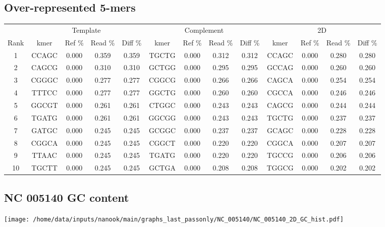 \documentclass[a4paper,11pt,oneside]{article}
\begin{document}
\subsection*{Over-represented 5-mers}
\vspace{-3mm}
\begin{table}[H]
{\footnotesize
\fontsize{7pt}{9pt}\selectfont
\begin{tabular}{|c|c c c c|c c c c|c c c c|}
\cline{1-13}
 & \multicolumn{4}{c|}{Template} & \multicolumn{4}{c|}{Complement} & \multicolumn{4}{c|}{2D} \\
Rank & kmer & Ref \% & Read \% & Diff \% & kmer & Ref \% & Read \% & Diff \% & kmer & Ref \% & Read \% & Diff \% \\
\cline{1-13}
1 & CCAGC & 0.000 & 0.359 & 0.359 & TGCTG & 0.000 & 0.312 & 0.312 & CCAGC & 0.000 & 0.280 & 0.280 \\
2 & CAGCG & 0.000 & 0.310 & 0.310 & GCTGG & 0.000 & 0.295 & 0.295 & GCCAG & 0.000 & 0.260 & 0.260 \\
3 & CGGGC & 0.000 & 0.277 & 0.277 & CGGCG & 0.000 & 0.266 & 0.266 & CAGCA & 0.000 & 0.254 & 0.254 \\
4 & TTTCC & 0.000 & 0.277 & 0.277 & GGCTG & 0.000 & 0.260 & 0.260 & CGCCA & 0.000 & 0.246 & 0.246 \\
5 & GGCGT & 0.000 & 0.261 & 0.261 & CTGGC & 0.000 & 0.243 & 0.243 & CAGCG & 0.000 & 0.244 & 0.244 \\
6 & TGATG & 0.000 & 0.261 & 0.261 & GGCGG & 0.000 & 0.243 & 0.243 & TGCTG & 0.000 & 0.237 & 0.237 \\
7 & GATGC & 0.000 & 0.245 & 0.245 & GCGGC & 0.000 & 0.237 & 0.237 & GCAGC & 0.000 & 0.228 & 0.228 \\
8 & CGGCA & 0.000 & 0.245 & 0.245 & CGGCT & 0.000 & 0.220 & 0.220 & CGGCA & 0.000 & 0.207 & 0.207 \\
9 & TTAAC & 0.000 & 0.245 & 0.245 & TGATG & 0.000 & 0.220 & 0.220 & TGCCG & 0.000 & 0.206 & 0.206 \\
10 & TGCTT & 0.000 & 0.245 & 0.245 & GCTGA & 0.000 & 0.208 & 0.208 & TGGCG & 0.000 & 0.202 & 0.202 \\
\cline{1-13}
\end{tabular}
}
\end{table}
\vspace{-8mm}
\begin{figure}[H]
\centering
   \end{figure}
\subsection*{NC 005140 GC content}
  \texttt{[image: /home/data/inputs/nanook/main/graphs\_last\_passonly/NC\_005140/NC\_005140\_2D\_GC\_hist.pdf]}
\clearpage
\end{document}
